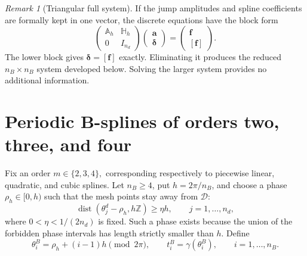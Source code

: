 \documentclass[11pt,a4paper]{amsart}
\theoremstyle{plain}
\theoremstyle{definition}
\theoremstyle{remark}
\newtheorem{remark}[theorem]{Remark}
\newcommand{\D}{\mathcal D}
\newcommand{\dist}{\operatorname{dist}}
\begin{document}
\begin{remark}[Triangular full system]\label{rem:triangular}
If the jump amplitudes and spline coefficients are formally kept in one vector, the discrete equations have the block form
\[
\begin{pmatrix}
 \mathbb A_h & \mathbb H_h\\
 0 & I_{n_d}
\end{pmatrix}
\begin{pmatrix}\bm a\\\bm\delta\end{pmatrix}
=
\begin{pmatrix}\bm f\\\bm{[f]}\end{pmatrix}.
\]
The lower block gives $\bm\delta=\bm{[f]}$ exactly.  Eliminating it produces the reduced $n_B\times n_B$ system developed below.  Solving the larger system provides no additional information.
\end{remark}

\section{Periodic B-splines of orders two, three, and four}\label{sec:splines}

Fix an order
$
        m\in\{2,3,4\},
$
corresponding respectively to piecewise linear, quadratic, and cubic splines.  Let $n_B\ge4$, put $h=2\pi/n_B$, and choose a phase $\rho_h\in[0,h)$ such that the mesh points stay away from $\D$:
\begin{equation}\label{eq:phase}
        \dist(\theta_j^d-\rho_h,h\mathbb Z)\ge\eta h,
        \qquad j=1,\ldots,n_d,
\end{equation}
where $0<\eta<1/(2n_d)$ is fixed.  Such a phase exists because the union of the forbidden phase intervals has length strictly smaller than $h$.  Define
\[
        \theta_i^B=\rho_h+(i-1)h\pmod{2\pi},
        \qquad t_i^B=\gamma(\theta_i^B),
        \qquad i=1,\ldots,n_B.
\]
\end{document}

